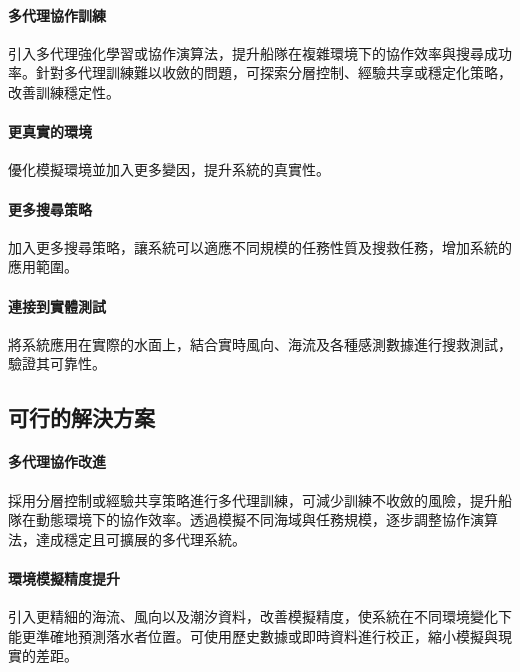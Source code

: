 \documentclass[12pt,a4paper]{article}
\begin{document}
\paragraph{多代理協作訓練}  引入多代理強化學習或協作演算法，提升船隊在複雜環境下的協作效率與搜尋成功率。針對多代理訓練難以收斂的問題，可探索分層控制、經驗共享或穩定化策略，改善訓練穩定性。

\paragraph{更真實的環境} 優化模擬環境並加入更多變因，提升系統的真實性。

\paragraph{更多搜尋策略} 加入更多搜尋策略，讓系統可以適應不同規模的任務性質及搜救任務，增加系統的應用範圍。

\paragraph{連接到實體測試} 將系統應用在實際的水面上，結合實時風向、海流及各種感測數據進行搜救測試，驗證其可靠性。

\subsection{可行的解決方案}
\paragraph{多代理協作改進} 採用分層控制或經驗共享策略進行多代理訓練，可減少訓練不收斂的風險，提升船隊在動態環境下的協作效率。透過模擬不同海域與任務規模，逐步調整協作演算法，達成穩定且可擴展的多代理系統。

\paragraph{環境模擬精度提升}  
引入更精細的海流、風向以及潮汐資料，改善模擬精度，使系統在不同環境變化下能更準確地預測落水者位置。可使用歷史數據或即時資料進行校正，縮小模擬與現實的差距。

\newpage
\end{document}
